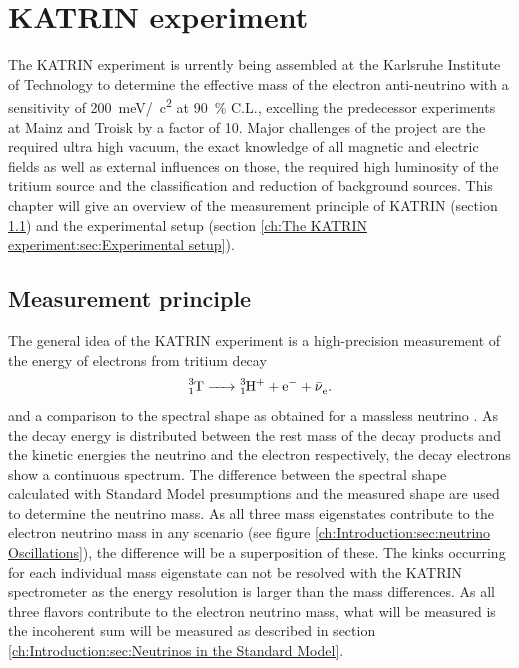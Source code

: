 %

    \chapter{KATRIN experiment}
    \label{ch:The KATRIN experiment}
    The KATRIN experiment is urrently being assembled at the Karlsruhe Institute of Technology to determine the effective mass of the electron anti-neutrino with a sensitivity of \SI{200}{\milli\electronvolt}/\SI{}{\square c} at \SI{90}{\percent} C.L., excelling the predecessor  experiments at Mainz and Troisk by a factor of \SI{10}{}. Major challenges of the project are the required ultra high vacuum, the exact knowledge of all magnetic and electric fields as well as external influences on those, the required high luminosity of the tritium source and the classification and reduction of background sources. This chapter will give an overview of the measurement principle of KATRIN (section \ref{ch:The KATRIN experiment:sec:Measurement Principle}) and the experimental setup (section \ref{ch:The KATRIN experiment:sec:Experimental setup}).
    
      \section{Measurement principle}
      \label{ch:The KATRIN experiment:sec:Measurement Principle}
      The general idea of the KATRIN experiment is a high-precision measurement of the energy of electrons from tritium decay 
      \begin{equation}
      	\ce{^3_1T -> ^3_1H^+ + e^- + \bar{\nu}_e}.
      \end{equation}
      and a comparison to the spectral shape as obtained for a massless neutrino \cite{Otten:2008zz}.
      As the decay energy is distributed between the rest mass of the decay products and the kinetic energies the neutrino and the electron respectively, the decay electrons show a continuous spectrum. The difference between the spectral shape calculated with Standard Model presumptions and the measured shape are used to determine the neutrino mass. As all three mass eigenstates contribute to the electron neutrino mass in any scenario (see figure \ref{ch:Introduction:sec:neutrino Oscillations}), the difference will be a superposition of these. The kinks occurring for each individual mass eigenstate can not be resolved with the KATRIN spectrometer as the energy resolution is larger than the mass differences. As all three flavors contribute to the electron neutrino mass, what will be measured is the incoherent sum will be measured as described in section \ref{ch:Introduction:sec:Neutrinos in the Standard Model}.
      
